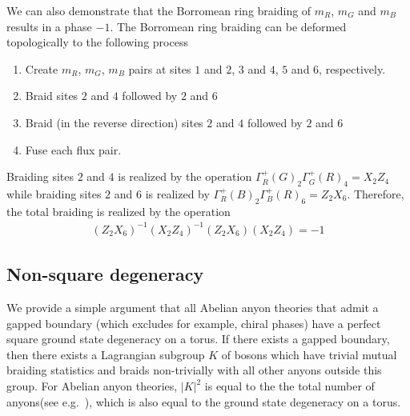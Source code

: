 \documentclass[nofootinbib,pra,twocolumn,showpacs,superscriptaddress,notitlepage,amsmath]{revtex4-2} %
\begin{document}
We can also demonstrate that the Borromean ring braiding of $m_R$, $m_G$ and $m_B$ results in a phase $-1$. The Borromean ring braiding can be deformed topologically to the following process~\cite{wang_topological_2015}
\begin{enumerate}
    \item Create $m_R$, $m_G$, $m_B$ pairs at sites $1$ and $2$, $3$ and $4$, $5$ and $6$, respectively.
    \item Braid sites $2$ and $4$ followed by $2$ and $6$
    \item Braid (in the reverse direction) sites $2$ and $4$ followed by $2$ and $6$
    \item Fuse each flux pair.
\end{enumerate}
Braiding sites $2$ and $4$ is realized by the operation $\Gamma^+_R(G)_2 \Gamma^+_G(R)_4 = X_2 Z_4$ while braiding sites $2$ and $6$ is realized by $\Gamma^+_R(B)_2 \Gamma^+_B(R)_6 = Z_2 X_6$. Therefore, the total braiding is realized by the operation
\begin{align}
 (Z_2 X_6)^{-1} (X_2 Z_4)^{-1} (Z_2 X_6) (X_2 Z_4) = -1
\end{align}


\subsection{Non-square degeneracy}
\label{methods_nonsquare_GSD}
We provide a simple argument that all Abelian anyon theories that admit a gapped boundary (which excludes for example, chiral phases) have a perfect square ground state degeneracy on a torus. If there exists a gapped boundary, then there exists a Lagrangian subgroup $K$ of bosons which have trivial mutual braiding statistics and braids non-trivially with all other anyons outside this group. For Abelian anyon theories, $|K|^2$ is equal to the the total number of anyons(see e.g.~\cite{Kaidi22}), which is also equal to the ground state degeneracy on a torus.
\end{document}

